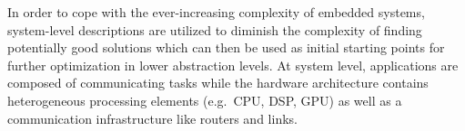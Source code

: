 In order to cope with the ever-increasing complexity of embedded systems, system-level descriptions are utilized to diminish the complexity of finding potentially good solutions which can then be used as initial starting points for further optimization in lower abstraction levels. At system level, applications are composed of communicating tasks while the hardware architecture contains heterogeneous processing elements (e.g.~CPU, DSP, GPU) as well as a communication infrastructure like routers and links. 

